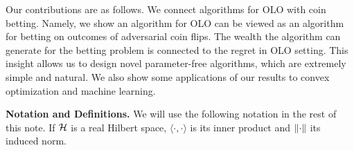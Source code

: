 Our contributions are as follows. We connect algorithms for \ac{OLO} with coin
betting. Namely, we show an algorithm for \ac{OLO} can be viewed as an
algorithm for betting on outcomes of adversarial coin flips. The wealth the
algorithm can generate for the betting problem is connected to the regret in
\ac{OLO} setting. This insight allows us to design novel parameter-free
algorithms, which are extremely simple and natural. We also show some
applications of our results to convex optimization and machine learning.

\noindent\textbf{Notation and Definitions.}
We will use the following notation in the rest of this note.  If $\mathcal{H}$ is a real
Hilbert space, $\langle \cdot, \cdot \rangle$ is its inner product and
$\left\|{\cdot}\right\|$ its induced norm.
